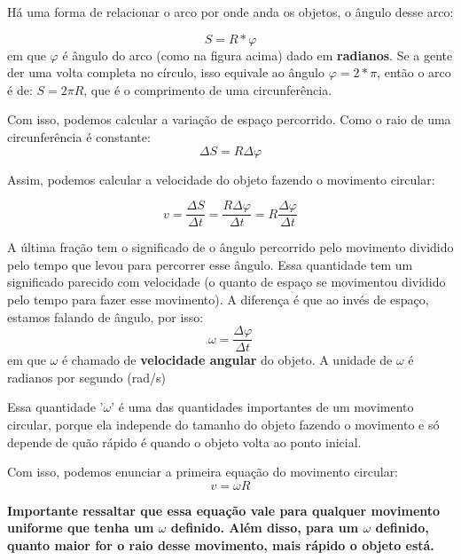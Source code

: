 \documentclass[12pt]{extarticle}
\newcommand{\<}{\langle}
\renewcommand{\>}{\rangle}
\theoremstyle{definition}
\begin{document}
Há uma forma de relacionar o arco por onde anda os objetos, o ângulo desse arco:

\begin{equation}
    S = R*\varphi
\end{equation}
\noindent em que $\varphi$ é ângulo do arco (como na figura acima) dado em \textbf{radianos}. Se a gente der uma volta completa no círculo, isso equivale ao ângulo $\varphi=2*\pi$, então o arco é de: $S = 2\pi R$, que é o comprimento de uma circunferência.

Com isso, podemos calcular a variação de espaço percorrido. Como o raio de uma circunferência é constante:
\begin{equation}
    \Delta S = R\Delta\varphi
\end{equation}

Assim, podemos calcular a velocidade do objeto fazendo o movimento circular:

\begin{equation}
    v =\frac{\Delta S}{\Delta t} = \frac{R\Delta \varphi}{\Delta t} = R \frac{\Delta \varphi}{\Delta t}
\end{equation}

A última fração tem o significado de o ângulo percorrido pelo movimento dividido pelo tempo que levou para percorrer esse ângulo. Essa quantidade tem um significado parecido com velocidade (o quanto de espaço se movimentou dividido pelo tempo para fazer esse movimento). A diferença é que ao invés de espaço, estamos falando de ângulo, por isso:
\begin{equation}
    \omega = \frac{\Delta \varphi}{\Delta t}
\end{equation}
\noindent em que $\omega$ é chamado de \textbf{velocidade angular} do objeto. A unidade de $\omega$ é radianos por segundo (rad/s)

Essa quantidade '$\omega$' é uma das quantidades importantes de um movimento circular, porque ela independe do tamanho do objeto fazendo o movimento e só depende de quão rápido é quando o objeto volta ao ponto inicial.

Com isso, podemos enunciar a primeira equação do movimento circular:
\begin{equation}
    \boxed{v=\omega R}
\end{equation}

\textbf{Importante ressaltar que essa equação vale para qualquer movimento uniforme que tenha um $\omega$ definido. Além disso, para um $\omega$ definido, quanto maior for o raio desse movimento, mais rápido o objeto está.}
\end{document}
